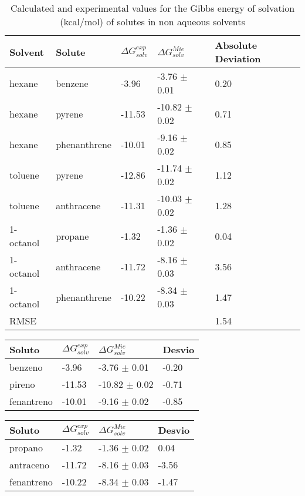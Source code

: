 \begin{table*}[h]
\center
  \caption{Calculated and experimental values for the Gibbs energy of solvation (kcal/mol) of solutes in non aqueous solvents}
  \label{tbl:solv1}
  \begin{tabular}{lllll}
    \hline
      Solvent & Solute & $\Delta G_{solv}^{exp}$ & $\Delta G_{solv}^{Mie}$ & Absolute Deviation \\
    \hline
    hexane    & benzene      & -3.96  & -3.76  $\pm$ 0.01 & 0.20 \\
    hexane    & pyrene       & -11.53 & -10.82 $\pm$ 0.02 & 0.71 \\
    hexane    & phenanthrene & -10.01 & -9.16  $\pm$ 0.02 & 0.85 \\
    toluene   & pyrene       & -12.86 & -11.74 $\pm$ 0.02 & 1.12\\
    toluene   & anthracene   & -11.31 & -10.03 $\pm$ 0.02 & 1.28\\
    1-octanol & propane      & -1.32  & -1.36  $\pm$ 0.02 & 0.04 \\
    1-octanol & anthracene   & -11.72 & -8.16  $\pm$ 0.03 & 3.56 \\
    1-octanol & phenanthrene & -10.22 & -8.34  $\pm$ 0.03 & 1.47 \\
    \hline
    RMSE      &              &        &                   & 1.54     \\
    \hline
  \end{tabular}

\end{table*}

\begin{table*}[h]
\center
  \label{tbl:solv1tes}
  \begin{tabular}{llll}
    \hline
     Soluto & $\Delta G_{solv}^{exp}$ & $\Delta G_{solv}^{Mie}$ & Desvio \\
    \hline
    benzeno      & -3.96  & -3.76  $\pm$ 0.01 & -0.20 \\
    pireno       & -11.53 & -10.82 $\pm$ 0.02 & -0.71 \\
    fenantreno   & -10.01 & -9.16  $\pm$ 0.02 & -0.85 \\
    \hline
  \end{tabular}

\end{table*}

\begin{table*}[h]
\center
  \label{tbl:solv1tes}
  \begin{tabular}{llll}
    \hline
     Soluto & $\Delta G_{solv}^{exp}$ & $\Delta G_{solv}^{Mie}$ & Desvio \\
    \hline
    propano      & -1.32  & -1.36  $\pm$ 0.02 & 0.04 \\
    antraceno   & -11.72 & -8.16  $\pm$ 0.03 & -3.56 \\
    fenantreno & -10.22 & -8.34  $\pm$ 0.03 & -1.47 \\
    \hline
  \end{tabular}

\end{table*}

